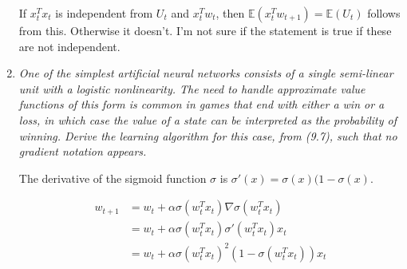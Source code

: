 \documentclass[12pt,a4paper]{article}
\begin{document}
\begin{enumerate}
  If $x_t^T x_t$ is independent from $U_t$ and $x_t^Tw_t$, then $\mathbb{E}(x_t^Tw_{t + 1}) = \mathbb{E}(U_t)$
  follows from this. Otherwise it doesn't. I'm not sure if the statement is true if
  these are not independent.

  \item \textit{One of the simplest artificial neural networks consists of a single semi-linear
  unit with a logistic nonlinearity. The need to handle approximate value functions of this
  form is common in games that end with either a win or a loss, in which case the value of
  a state can be interpreted as the probability of winning. Derive the learning algorithm
  for this case, from (9.7), such that no gradient notation appears.}

  The derivative of the sigmoid function $\sigma$ is $\sigma'(x) = \sigma(x)
  (1 - \sigma(x)$.

  \begin{align*}
    w_{t + 1} &= w_t + \alpha\sigma(w_t^Tx_t) \nabla \sigma(w_t^Tx_t)\\
    &= w_t + \alpha \sigma(w_t^Tx_t) \sigma'(w_t^Tx_t) x_t \\
    &= w_t + \alpha \sigma(w_t^Tx_t)^2(1 - \sigma(w_t^Tx_t)) x_t \\
  \end{align*}

\end{enumerate}
\end{document}
